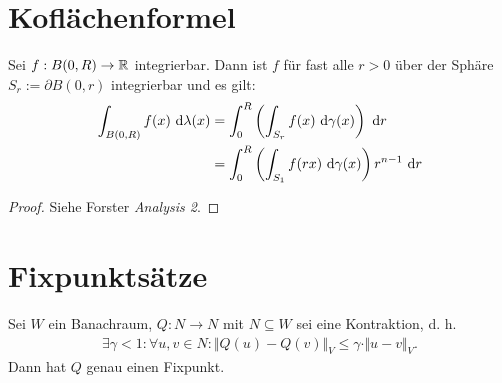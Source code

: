\section{Koflächenformel}
\begin{satz}
	Sei $f:B(0,R)\rightarrow \mathbb{R}$ integrierbar. 
	Dann ist $f$ für fast alle $r>0$ über der Sphäre $S_r := \partial B(0,r)$ integrierbar und es gilt:
	\begin{align*}
		\int_{B(0,R)}f(x) \text{ d}\lambda(x) &= \int_0^R \left(\int_{S_r} f(x) \text{ d}\gamma(x)\right) \text{ d} r \\
																	 &= \int_0^R \left(\int_{S_1} f(rx) \text{ d}\gamma(x)\right)r^{n-1} \text{ d} r
	\end{align*}
\end{satz}

\begin{proof}
	Siehe Forster \textit{Analysis 2}.
\end{proof}
	
\section{Fixpunktsätze}
\begin{satz}\label{BanachscherFixpunktsatz}\enter
	Sei $W$ ein Banachraum, $Q:N\to N$ mit $N\subseteq W$ sei eine Kontraktion, d. h.
	\begin{align*}
		\exists\gamma<1:\forall u,v\in N:\Vert Q(u)-Q(v)\Vert_V\leq\gamma\cdot\Vert u-v\Vert_V.
	\end{align*}
	Dann hat $Q$ genau einen Fixpunkt.
\end{satz}
